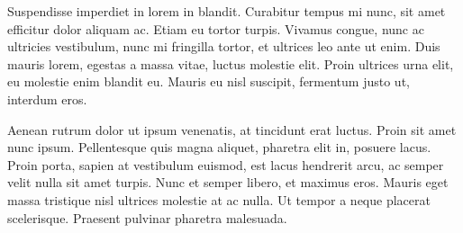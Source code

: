 \documentclass{llncs}
\begin{document}
Suspendisse imperdiet in lorem in blandit. Curabitur tempus mi nunc,
sit amet efficitur dolor aliquam ac. Etiam eu tortor turpis. Vivamus
congue, nunc ac ultricies vestibulum, nunc mi fringilla tortor, et
ultrices leo ante ut enim. Duis mauris lorem, egestas a massa vitae,
luctus molestie elit. Proin ultrices urna elit, eu molestie enim
blandit eu. Mauris eu nisl suscipit, fermentum justo ut, interdum
eros.

Aenean rutrum dolor ut ipsum venenatis, at tincidunt erat
luctus. Proin sit amet nunc ipsum. Pellentesque quis magna aliquet,
pharetra elit in, posuere lacus. Proin porta, sapien at vestibulum
euismod, est lacus hendrerit arcu, ac semper velit nulla sit amet
turpis. Nunc et semper libero, et maximus eros. Mauris eget massa
tristique nisl ultrices molestie at ac nulla. Ut tempor a neque
placerat scelerisque. Praesent pulvinar pharetra malesuada.
\end{document}
